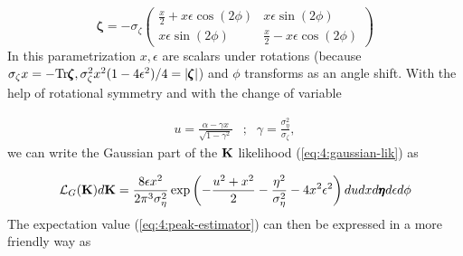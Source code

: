 \begin{equation}
\label{eq:4:hess-param}
\pmb{\zeta} = -\sigma_\zeta
\begin{pmatrix}
\displaystyle \frac{x}{2}+x\epsilon\cos(2\phi) & x\epsilon\sin(2\phi) \\
x\epsilon\sin(2\phi) & \displaystyle \frac{x}{2}-x\epsilon\cos(2\phi)
\end{pmatrix}
\end{equation}  
%
In this parametrization $x,\epsilon$ are scalars under rotations (because $\sigma_\zeta x=-{\rm Tr}\pmb{\zeta}, \sigma_\zeta^2x^2(1-4\epsilon^2)/4=\vert\pmb{\zeta}\vert$) and $\phi$ transforms as an angle shift. With the help of rotational symmetry and with the change of variable

\begin{equation}
\label{eq:4:wx}
\begin{matrix}
\displaystyle u = \frac{\alpha-\gamma x}{\sqrt{1-\gamma^2}} & ; & \displaystyle \gamma = \frac{\sigma_\eta^2}{\sigma_\zeta},
\end{matrix}
\end{equation} 
%
we can write the Gaussian part of the $\mathbf{K}$ likelihood (\ref{eq:4:gaussian-lik}) as 

\begin{equation}
\label{eq:4:gaussian-lik-pk}
\mathcal{L}_G(\mathbf{K})d\mathbf{K} = \frac{8\epsilon x^2}{2\pi^3\sigma_\eta^2}\exp\left(-\frac{u^2+x^2}{2}-\frac{\eta^2}{\sigma_\eta^2}-4x^2\epsilon^2\right)dudxd\pmb{\eta}d\epsilon d\phi
\end{equation} 
%
The expectation value (\ref{eq:4:peak-estimator}) can then be expressed in a more friendly way as 

